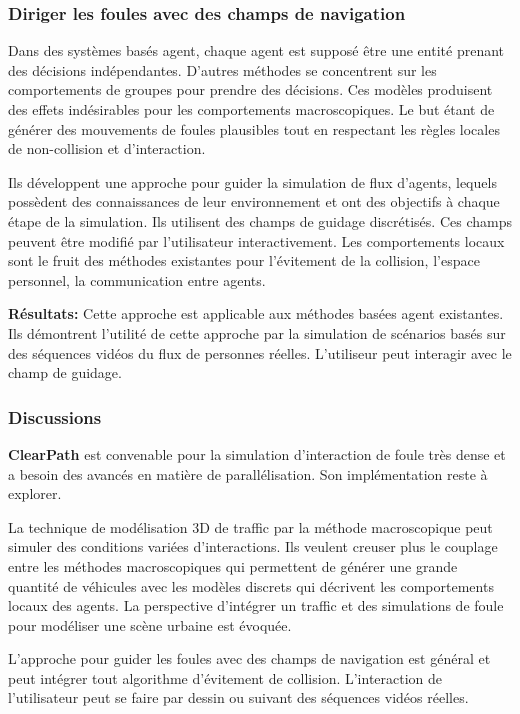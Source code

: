 \documentclass[11pt]{article}
\begin{document}
\subsubsection{Diriger les foules avec des champs de navigation}

Dans des systèmes basés agent, chaque agent est supposé être une entité prenant des décisions indépendantes. D'autres méthodes se concentrent sur les comportements de groupes pour prendre des décisions. Ces modèles produisent des effets indésirables pour les comportements macroscopiques. Le but étant de générer des mouvements de foules plausibles tout en respectant les règles locales de non-collision et d'interaction.

Ils développent une approche pour guider la simulation de flux d'agents, lequels possèdent des connaissances de leur environnement et ont des objectifs à chaque étape de la simulation. Ils utilisent des champs de guidage discrétisés. Ces champs peuvent être modifié par l'utilisateur interactivement. Les comportements locaux sont le fruit des méthodes existantes pour l'évitement de la collision, l'espace personnel, la communication entre agents.

\textbf{Résultats:} Cette approche est applicable aux méthodes basées agent existantes. Ils démontrent l'utilité de cette approche par la simulation de scénarios  basés sur des séquences vidéos du flux de personnes réelles. L'utiliseur peut interagir avec le champ de guidage.

\subsubsection{Discussions}

\textbf{ClearPath} est convenable pour la simulation d'interaction de foule très dense et a besoin des avancés en matière de parallélisation. Son implémentation reste à explorer.

La technique de modélisation 3D de traffic par la méthode macroscopique peut simuler des conditions variées d'interactions. Ils veulent creuser plus le couplage entre les méthodes macroscopiques qui permettent de générer une grande quantité de véhicules avec les modèles discrets qui décrivent les comportements locaux des agents. La perspective d'intégrer un traffic et des simulations de foule pour modéliser une scène urbaine est évoquée.

L'approche pour guider les foules avec des champs de navigation est général et peut intégrer tout algorithme d'évitement de collision. L'interaction de l'utilisateur peut se faire par dessin ou suivant des séquences vidéos réelles.
\end{document}
